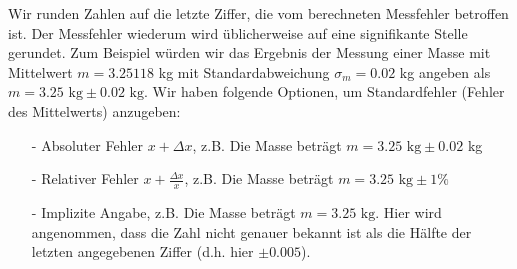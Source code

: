 Wir runden Zahlen auf die letzte Ziffer, die vom berechneten Messfehler betroffen ist. Der Messfehler wiederum wird üblicherweise auf eine signifikante Stelle gerundet. Zum Beispiel würden wir das Ergebnis der Messung einer Masse mit Mittelwert $m = 3.25118$ kg mit Standardabweichung $\sigma_m =0.02$ kg angeben als $m=3.25\text{ kg}\pm 0.02  
 \text{ kg}$. Wir haben folgende Optionen, um Standardfehler (Fehler des Mittelwerts) anzugeben:
 \begin{enumerate}
     \item[-] Absoluter Fehler $x + \Delta x$, z.B. Die Masse beträgt $m=3.25\text{ kg}\pm 0.02$ kg  
     \item[-] Relativer Fehler  $x + \frac{\Delta x}{x}$, z.B. Die Masse beträgt $m=3.25\text{ kg}\pm 1\%$ 
     \item[-] Implizite Angabe, z.B. Die Masse beträgt $m=3.25\text{ kg}$. Hier wird angenommen, dass die Zahl nicht genauer bekannt ist als die Hälfte der letzten angegebenen Ziffer (d.h. hier $\pm 0.005$).
 \end{enumerate}


\newpage


